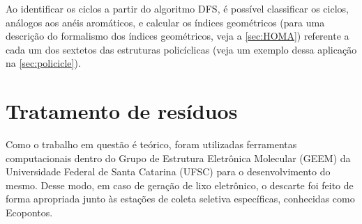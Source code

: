 Ao identificar os ciclos a partir do algoritmo \gls{DFS}, é possível classificar os ciclos, análogos aos anéis aromáticos, e calcular os índices geométricos (para uma descrição do formalismo dos índices geométricos, veja a \autoref{sec:HOMA}) referente a cada um dos sextetos das estruturas policíclicas (veja um exemplo dessa aplicação na \autoref{sec:policicle}). 

\newpage

\section{Tratamento de resíduos}

Como o trabalho em questão é teórico, foram utilizadas ferramentas computacionais dentro do Grupo de Estrutura Eletrônica Molecular (GEEM) da Universidade Federal de Santa Catarina (UFSC) para o desenvolvimento do mesmo. Desse modo, em caso de geração de lixo eletrônico, o descarte foi feito de forma apropriada junto às estações de coleta seletiva específicas, conhecidas como Ecopontos.